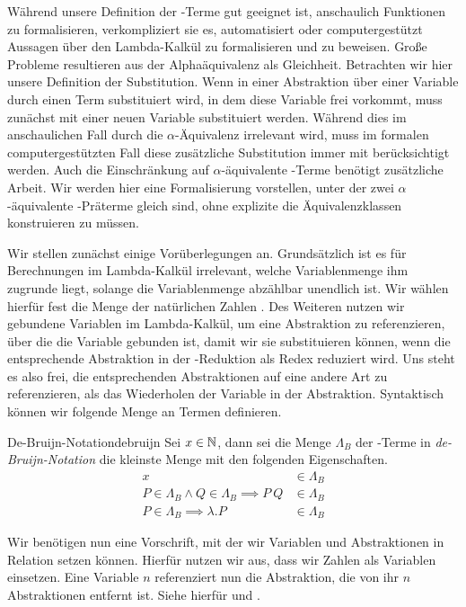 Während unsere Definition der \tlambda-Terme gut geeignet ist, anschaulich Funktionen zu formalisieren, verkompliziert sie es, automatisiert oder computergestützt Aussagen über den Lambda-Kalkül zu formalisieren und zu beweisen. Große Probleme resultieren aus der Alphaäquivalenz als Gleichheit. Betrachten wir hier unsere Definition der Substitution. Wenn in einer Abstraktion über einer Variable durch einen Term substituiert wird, in dem diese Variable frei vorkommt, muss zunächst mit einer neuen Variable substituiert werden. Während dies im anschaulichen Fall durch die $\alpha$-Äquivalenz irrelevant wird, muss im formalen computergestützten Fall diese zusätzliche Substitution immer mit berücksichtigt werden. Auch die Einschränkung auf $\alpha$-äquivalente \tlambda-Terme benötigt zusätzliche Arbeit. Wir werden hier eine Formalisierung vorstellen, unter der zwei $\alpha$-äquivalente \tlambda-Präterme gleich sind, ohne explizite die Äquivalenzklassen konstruieren zu müssen.

Wir stellen zunächst einige Vorüberlegungen an. Grundsätzlich ist es für Berechnungen im Lambda-Kalkül irrelevant, welche Variablenmenge ihm zugrunde liegt, solange die Variablenmenge abzählbar unendlich ist. Wir wählen hierfür fest die Menge der natürlichen Zahlen \nat. Des Weiteren nutzen wir gebundene Variablen im Lambda-Kalkül, um eine Abstraktion zu referenzieren, über die die Variable gebunden ist, damit wir sie substituieren können, wenn die entsprechende Abstraktion in der \tbeta-Reduktion als Redex reduziert wird. Uns steht es also frei, die entsprechenden Abstraktionen auf eine andere Art zu referenzieren, als das Wiederholen der Variable in der Abstraktion. Syntaktisch können wir folgende Menge an Termen definieren.

\begin{definition}{De-Bruijn-Notation\cite{debruijn}}{debruijn}
    Sei $x\in\mathbb{N}$, dann sei die Menge $\Lambda_B$ der \tlambda-Terme in \emph{de-Bruijn-Notation} die kleinste Menge mit den folgenden Eigenschaften.
    \begin{align*}
    x&\in\Lambda_B\\
    P\in\Lambda_B \land Q\in\Lambda_B \implies P~Q&\in\Lambda_B\\
    P\in\Lambda_B\implies \lambda.P&\in\Lambda_B
    \end{align*}
\end{definition}


Wir benötigen nun eine Vorschrift, mit der wir Variablen und Abstraktionen in Relation setzen können. Hierfür nutzen wir aus, dass wir Zahlen als Variablen einsetzen. Eine Variable $n$ referenziert nun die Abstraktion, die von ihr $n$ Abstraktionen entfernt ist. Siehe hierfür  und .

